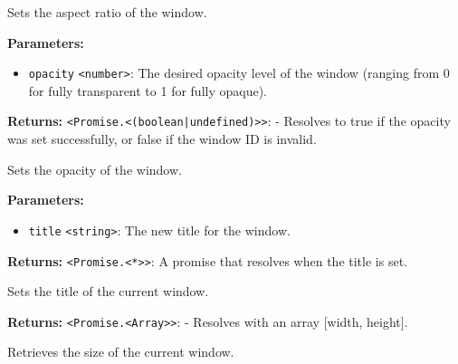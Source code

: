 \documentclass[12pt,a4paper]{article}
\begin{document}
\noindent Sets the aspect ratio of the window.

\vspace{5mm}
\noindent {}


\noindent \textbf{Parameters:}
\begin{itemize}
  \item \texttt{opacity} \texttt{<number>}: The desired opacity level of the window (ranging from \textasciigrave{}0\textasciigrave{} for fully transparent to \textasciigrave{}1\textasciigrave{} for fully opaque).
\end{itemize}

\noindent \textbf{Returns:} \texttt{<Promise.<(boolean|undefined)>>}: - Resolves to \textasciigrave{}true\textasciigrave{} if the opacity was set successfully, or \textasciigrave{}false\textasciigrave{} if the window ID is invalid.

\noindent Sets the opacity of the window.

\vspace{5mm}
\noindent {}


\noindent \textbf{Parameters:}
\begin{itemize}
  \item \texttt{title} \texttt{<string>}: The new title for the window.
\end{itemize}

\noindent \textbf{Returns:} \texttt{<Promise.<*>>}: A promise that resolves when the title is set.

\noindent Sets the title of the current window.

\vspace{5mm}
\noindent {}


\noindent \textbf{Returns:} \texttt{<Promise.<Array>>}: - Resolves with an array [width, height].

\noindent Retrieves the size of the current window.

\vspace{5mm}
\noindent {}
\end{document}
